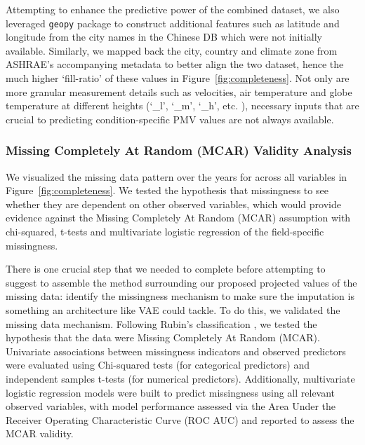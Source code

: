 Attempting to enhance the predictive power of the combined dataset, we also leveraged \texttt{geopy} package to construct additional features such as latitude and longitude from the city names in the Chinese DB which were not initially available. Similarly, we mapped back the city, country and climate zone from ASHRAE's accompanying metadata to better align the two dataset, hence the much higher `fill-ratio' of these values in Figure~\ref{fig:completeness}. Not only are more granular measurement details such as velocities, air temperature and globe temperature at different heights (`\_l', `\_m', `\_h', etc. ), necessary inputs that are crucial to predicting condition-specific PMV values are not always available. 

\subsubsection{Missing Completely At Random (MCAR) Validity Analysis}\label{sec:MAR_Validation}
We visualized the missing data pattern over the years for across all variables in Figure~\ref{fig:completeness}. We tested the hypothesis that missingness to see whether they are  dependent on other observed variables, which would provide evidence against the Missing Completely At Random (MCAR) assumption with chi-squared, t-tests and multivariate logistic regression of the field-specific missingness. 

There is one crucial step that we needed to complete before attempting to suggest to assemble the method surrounding our proposed projected values of the missing data: identify the missingness mechanism to make sure the imputation is something an architecture like VAE could tackle. To do this, we validated the missing data mechanism. Following Rubin's classification \cite{Rubin1976}, we tested the hypothesis that the data were Missing Completely At Random (MCAR). Univariate associations between missingness indicators and observed predictors were evaluated using Chi-squared tests (for categorical predictors) and independent samples t-tests (for numerical predictors). Additionally, multivariate logistic regression models were built to predict missingness using all relevant observed variables, with model performance assessed via the Area Under the Receiver Operating Characteristic Curve (ROC AUC) and reported to assess the MCAR validity.

